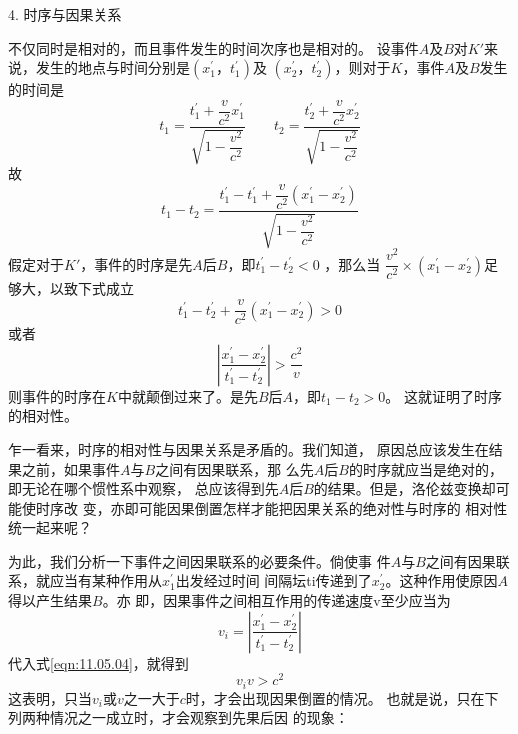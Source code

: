 \textsf{4. 时序与因果关系}

不仅同时是相对的，而且事件发生的时间次序也是相对的。
设事件$ A $及$ B $对$ K ' $来说，发生的地点与时间分别是$ \left( x _ 1 ^ { \prime } ， t _ 1 ^ { \prime } \right) $及
$ \left( x _ 2 ^ { \prime } ， t _ 2 ^ { \prime } \right)  $，则对于$ K $，事件$ A $及$ B $发生的时间是
\begin{equation*}
    t_{1}=\frac{t_{1}^{\prime}+\dfrac{v}{c^{2}} x_{1}^{\prime}}{\sqrt{1-\dfrac{v^{2}}{c^{2}}}}
    \qquad
    t_{2}=\frac{t_{2}^{\prime}+\dfrac{v}{c^{2}} x_{2}^{\prime}}{\sqrt{1-\dfrac{v^{2}}{c^{2}}}}
\end{equation*}
故\vspace{-1.56em}
\begin{equation*}
    t_{1}-t_{2}=\frac{t_{1}^{\prime}-t_{1}^{\prime}+\dfrac{v}{c^{2}}\left(x_{1}^{\prime}-x_{2}^{\prime}\right)}{\sqrt{1-\dfrac{v^{2}}{c^{2}}}}
\end{equation*}
假定对于$ K' $，事件的时序是先$ A $后$ B $，即$  t _ { 1 } ^ { \prime } - t _ 2 ^ { \prime } < 0  $ ，那么当
$ \dfrac{v^{2}}{c^{2}} \times \left( x _ { 1 } ^ { \prime } - x _ { 2 } ^ { \prime } \right) $足够大，以致下式成立
\begin{equation*}
    t _ { 1 } ^ { \prime } - t _ 2 ^ { \prime } + \frac { v } { c ^ { 2 } } \left( x _ 1 ^ { \prime } - x _ 2 ^ { \prime } \right) > 0
\end{equation*}
或者\vspace{-1.56em}
\begin{equation}\label{eqn:11.05.04}
    \left| \frac { x _ 1 ^ { \prime } - x _ 2 ^ { \prime } } { t _ 1 ^ { \prime } - t _ 2 ^ { \prime } } \right| > \frac { c ^ { 2 } } { v }
\end{equation}
则事件的时序在$ K $中就颠倒过来了。是先$ B $后$ A $，即$  t _ { 1 } - t _ { 2 } > 0  $。
这就证明了时序的相对性。

乍一看来，时序的相对性与因果关系是矛盾的。我们知道，
原因总应该发生在结果之前，如果事件$ A $与$ B $之间有因果联系，那
么先$ A $后$ B $的时序就应当是绝对的，即无论在哪个惯性系中观察，
总应该得到先$ A $后$ B $的结果。但是，洛伦兹变换却可能使时序改
变，亦即可能因果倒置怎样才能把因果关系的绝对性与时序的
相对性统一起来呢？

为此，我们分析一下事件之间因果联系的必要条件。倘使事
件$ A $与$ B $之间有因果联系，就应当有某种作用从$ x _ 1 ^ { \prime } $出发经过时间
间隔坛ti传递到了$ x _ 2 ^ { \prime } $。这种作用使原因$ A $得以产生结果$ B $。亦
即，因果事件之间相互作用的传递速度v至少应当为
\begin{equation*}
    v _ { i } = \left| \frac { x _ 1 ^ { \prime } - x _ 2 ^ { \prime } } { t _ 1 ^ { \prime } - t _ 2 ^ { \prime } } \right|
\end{equation*}
代入式\eqref{eqn:11.05.04}，就得到
\begin{equation*}
    v _ { i } v > c ^ { 2 }
\end{equation*}
这表明，只当$ v _ i $或$ v $之一大于$ c $时，才会出现因果倒置的情况。
也就是说，只在下列两种情况之一成立时，才会观察到先果后因
的现象：

